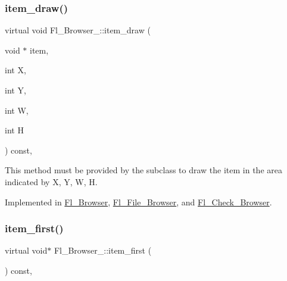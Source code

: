 \mbox{\label{class_fl___browser___ad145a5000b8ec78a45270a1d9294aa15}} 
\subsubsection{\texorpdfstring{item\+\_\+draw()}{item\_draw()}}
{\footnotesize\ttfamily virtual void Fl\+\_\+\+Browser\+\_\+\+::item\+\_\+draw (\begin{DoxyParamCaption}\item[{void $\ast$}]{item,  }\item[{int}]{X,  }\item[{int}]{Y,  }\item[{int}]{W,  }\item[{int}]{H }\end{DoxyParamCaption}) const\hspace{0.3cm}{\ttfamily [protected]}, {}}

This method must be provided by the subclass to draw the {\ttfamily item} in the area indicated by {\ttfamily X}, {\ttfamily Y}, {\ttfamily W}, {\ttfamily H}. 

Implemented in \hyperlink{class_fl___browser_a99dd1f2cf866b107a5742d1e35774620}{Fl\+\_\+\+Browser}, \hyperlink{class_fl___file___browser_adac9f1a1881c10b99250861ec1794b99}{Fl\+\_\+\+File\+\_\+\+Browser}, and \hyperlink{class_fl___check___browser_a4d3901a7e14353cdc4db876ca957f30a}{Fl\+\_\+\+Check\+\_\+\+Browser}.

\mbox{\label{class_fl___browser___a43dd6231f2684f132a5a33b5d7d0c8e7}} 
\subsubsection{\texorpdfstring{item\+\_\+first()}{item\_first()}}
{\footnotesize\ttfamily virtual void$\ast$ Fl\+\_\+\+Browser\+\_\+\+::item\+\_\+first (\begin{DoxyParamCaption}{ }\end{DoxyParamCaption}) const\hspace{0.3cm}{\ttfamily [protected]}, {}}

